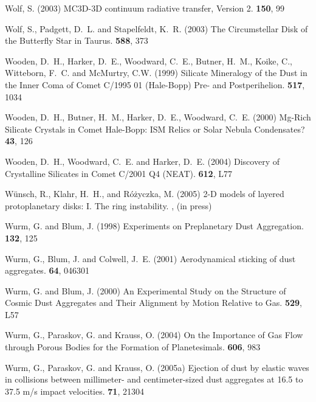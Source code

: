 \begin{literature}
\item
Wolf, S. (2003) MC3D-3D continuum radiative transfer, Version 2. \cpc
\textbf{150}, 99

\item
Wolf, S., Padgett, D.~L. and Stapelfeldt, K.~R. (2003) The Circumstellar
Disk of the Butterfly Star in Taurus. \apj \textbf{588}, 373

\item
Wooden, D.~H., Harker, D.~E., Woodward, C.~E., Butner, H.~M., Koike, C.,
Witteborn, F.~C. and McMurtry, C.W. (1999) Silicate Mineralogy of the Dust in
the Inner Coma of Comet C/1995 01 (Hale-Bopp) Pre- and Postperihelion. 
\apj \textbf{517}, 1034

\item
Wooden, D.~H., Butner, H.~M., Harker, D.~E., Woodward, C.~E. (2000) Mg-Rich
Silicate Crystals in Comet Hale-Bopp: ISM Relics or Solar Nebula Condensates?
\ica \textbf{43}, 126

\item
Wooden, D.~H., Woodward, C.~E. and Harker, D.~E. (2004) Discovery of
Crystalline Silicates in Comet C/2001 Q4 (NEAT). \apj \textbf{612}, L77

\item
W\"unsch, R., Klahr, H.~H., and R\'o\.zyczka, M. (2005) 2-D models of layered
protoplanetary disks: I. The ring instability. \mn, (in press)

\item
Wurm, G. and Blum, J. (1998) Experiments on Preplanetary Dust Aggregation.
\ica \textbf{132}, 125

\item
Wurm, G., Blum, J. and Colwell, J.~E. (2001) Aerodynamical sticking of dust
aggregates. \phre \textbf{64}, 046301

\item
Wurm, G. and Blum, J. (2000) An Experimental Study on the Structure of
Cosmic Dust Aggregates and Their Alignment by Motion Relative to Gas. \apj
\textbf{529}, L57

\item
Wurm, G., Paraskov, G. and Krauss, O. (2004) On the Importance of Gas Flow
through Porous Bodies for the Formation of Planetesimals. \apj \textbf{606},
983

\item
Wurm, G., Paraskov, G. and Krauss, O. (2005a) Ejection of dust by elastic
waves in collisions between millimeter- and centimeter-sized dust aggregates
at 16.5 to 37.5 m/s impact velocities. \phre \textbf{71}, 21304


\end{literature}
